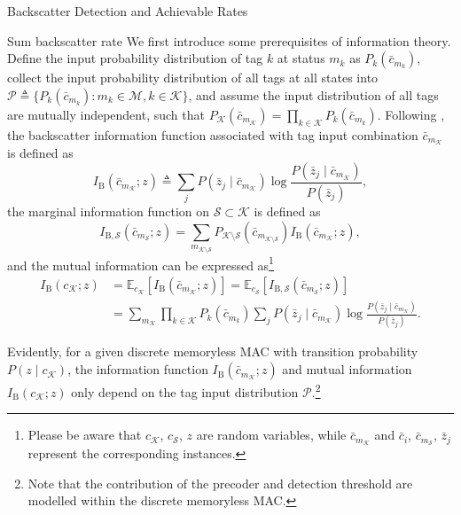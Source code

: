 \documentclass[journal]{IEEEtran}
\begin{document}
\begin{section}{Backscatter Detection and Achievable Rates}
		\begin{subsection}{Sum backscatter rate}
			We first introduce some prerequisites of information theory. Define the input probability distribution of tag $k$ at status $m_k$ as $P_k(\bar{c}_{m_k})$, collect the input probability distribution of all tags at all states into $\mathcal{P} \triangleq \{P_k(\bar{c}_{m_k}) : m_k \in \mathcal{M}, k \in \mathcal{K}\}$, and assume the input distribution of all tags are mutually independent, such that $P_{\mathcal{K}}(\bar{c}_{m_{\mathcal{K}}}) = \prod_{k \in \mathcal{K}} P_k(\bar{c}_{m_k})$. Following \cite{Rezaeian2004}, the backscatter information function associated with tag input combination $\bar{c}_{m_{\mathcal{K}}}$ is defined as
			\begin{equation}
				I_{\mathrm{B}}(\bar{c}_{m_{\mathcal{K}}} ; z) \triangleq \sum_j P(\bar{z}_j \mid \bar{c}_{m_{\mathcal{K}}}) \log \frac{P(\bar{z}_j \mid \bar{c}_{m_{\mathcal{K}}})}{P(\bar{z}_j)},
				\label{eq:information_function}
			\end{equation}
			the marginal information function on $\mathcal{S} \subset \mathcal{K}$ is defined as
			\begin{equation}
				I_{\mathrm{B},\mathcal{S}}(\bar{c}_{m_{\mathcal{S}}} ; z) = \sum_{m_{\mathcal{K} \setminus \mathcal{S}}} P_{\mathcal{K} \setminus \mathcal{S}}(\bar{c}_{m_{\mathcal{K} \setminus \mathcal{S}}}) I_{\mathrm{B}}(\bar{c}_{m_{\mathcal{K}}} ; z),
				\label{eq:marginal_information_function}
			\end{equation}
			and the mutual information can be expressed as\footnote{Please be aware that $c_{\mathcal{K}}$, $c_{\mathcal{S}}$, $z$ are random variables, while $\bar{c}_{m_{\mathcal{K}}}$ and $\bar{c}_i$, $\bar{c}_{m_{\mathcal{S}}}$, $\bar{z}_j$ represent the corresponding instances.}
			\begin{align}
				I_{\mathrm{B}}(c_{\mathcal{K}} ; z)
				& = \mathbb{E}_{c_{\mathcal{K}}} \left[I_{\mathrm{B}}(\bar{c}_{m_{\mathcal{K}}} ; z)\right] = \mathbb{E}_{c_{\mathcal{S}}} \left[I_{\mathrm{B},\mathcal{S}}(\bar{c}_{m_{\mathcal{S}}} ; z)\right]\label{eq:mutual_information}\\
				& = \sum_{m_{\mathcal{K}}} \prod_{k \in \mathcal{K}} P_k(\bar{c}_{m_k}) \sum_j P(\bar{z}_j \mid \bar{c}_{m_{\mathcal{K}}}) \log \frac{P(\bar{z}_j \mid \bar{c}_{m_{\mathcal{K}}})}{P(\bar{z}_j)}.\label{eq:backscatter_sum_rate}
			\end{align}

			Evidently, for a given discrete memoryless MAC with transition probability $P(z \mid c_{\mathcal{K}})$, the information function $I_{\mathrm{B}}(\bar{c}_{m_{\mathcal{K}}} ; z)$ and mutual information $I_{\mathrm{B}}(c_{\mathcal{K}} ; z)$ only depend on the tag input distribution $\mathcal{P}$.\footnote{Note that the contribution of the precoder and detection threshold are modelled within the discrete memoryless MAC.}
		\end{subsection}


\end{section}
\end{document}
